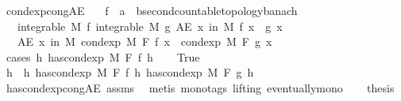 \begin{isabellebody}
\endisatagproof
{\isafoldproof}%
%
\isadelimproof
\isanewline
%
\endisadelimproof
\isanewline
{}\isamarkupfalse%
\ cond{\isacharunderscore}{\kern0pt}exp{\isacharunderscore}{\kern0pt}cong{\isacharunderscore}{\kern0pt}AE{\isacharcolon}{\kern0pt}\isanewline
\ \ \ f\ {\isacharcolon}{\kern0pt}{\isacharcolon}{\kern0pt}\ {\isachardoublequoteopen}{\isacharprime}{\kern0pt}a\ {\isasymRightarrow}\ {\isacharprime}{\kern0pt}b{\isacharcolon}{\kern0pt}{\isacharcolon}{\kern0pt}{\isacharbraceleft}{\kern0pt}second{\isacharunderscore}{\kern0pt}countable{\isacharunderscore}{\kern0pt}topology{\isacharcomma}{\kern0pt}banach{\isacharbraceright}{\kern0pt}{\isachardoublequoteclose}\isanewline
\ \ \ {\isachardoublequoteopen}integrable\ M\ f{\isachardoublequoteclose}\ {\isachardoublequoteopen}integrable\ M\ g{\isachardoublequoteclose}\ {\isachardoublequoteopen}AE\ x\ in\ M{\isachardot}{\kern0pt}\ f\ x\ {\isacharequal}{\kern0pt}\ g\ x{\isachardoublequoteclose}\isanewline
\ \ \ {\isachardoublequoteopen}AE\ x\ in\ M{\isachardot}{\kern0pt}\ cond{\isacharunderscore}{\kern0pt}exp\ M\ F\ f\ x\ {\isacharequal}{\kern0pt}\ cond{\isacharunderscore}{\kern0pt}exp\ M\ F\ g\ x{\isachardoublequoteclose}\isanewline
%
\isadelimproof
%
\endisadelimproof
%
\isatagproof
{}\isamarkupfalse%
\ {\isacharparenleft}{\kern0pt}cases\ {\isachardoublequoteopen}{\isasymexists}h{\isachardot}{\kern0pt}\ has{\isacharunderscore}{\kern0pt}cond{\isacharunderscore}{\kern0pt}exp\ M\ F\ f\ h{\isachardoublequoteclose}{\isacharparenright}{\kern0pt}\isanewline
\ \ \isamarkupfalse%
\ True\isanewline
\ \ \isamarkupfalse%
\ \isamarkupfalse%
\ h\ \ h{\isacharcolon}{\kern0pt}\ {\isachardoublequoteopen}has{\isacharunderscore}{\kern0pt}cond{\isacharunderscore}{\kern0pt}exp\ M\ F\ f\ h{\isachardoublequoteclose}\ {\isachardoublequoteopen}has{\isacharunderscore}{\kern0pt}cond{\isacharunderscore}{\kern0pt}exp\ M\ F\ g\ h{\isachardoublequoteclose}\ \isamarkupfalse%
\ has{\isacharunderscore}{\kern0pt}cond{\isacharunderscore}{\kern0pt}exp{\isacharunderscore}{\kern0pt}cong{\isacharunderscore}{\kern0pt}AE\ assms\ \isamarkupfalse%
\ {\isacharparenleft}{\kern0pt}metis\ {\isacharparenleft}{\kern0pt}mono{\isacharunderscore}{\kern0pt}tags{\isacharcomma}{\kern0pt}\ lifting{\isacharparenright}{\kern0pt}\ eventually{\isacharunderscore}{\kern0pt}mono{\isacharparenright}{\kern0pt}\isanewline
\ \ \isamarkupfalse%
\ {\isacharquery}{\kern0pt}thesis\ \isamarkupfalse%

\end{isabellebody}
